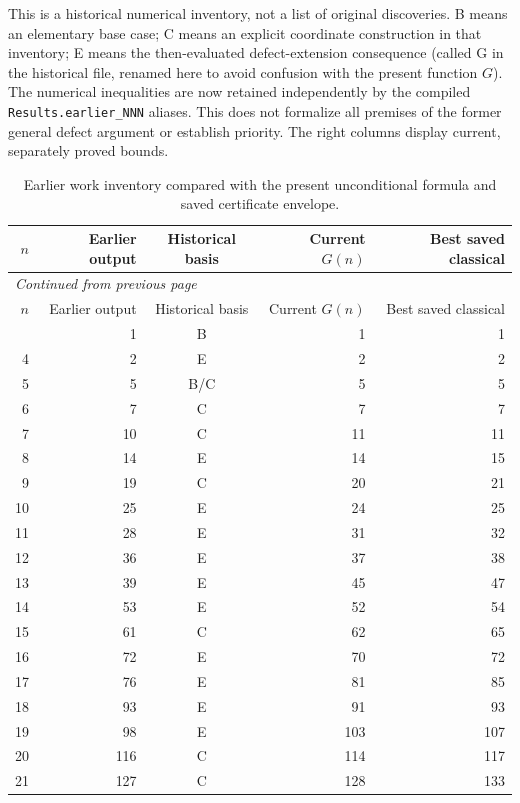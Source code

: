 \noindent This is a historical numerical inventory, not a list of original discoveries. B means an elementary base case; C means an explicit coordinate construction in that inventory; E means the then-evaluated defect-extension consequence (called G in the historical file, renamed here to avoid confusion with the present function $G$). The numerical inequalities are now retained independently by the compiled \texttt{Results.earlier\_NNN} aliases. This does not formalize all premises of the former general defect argument or establish priority. The right columns display current, separately proved bounds.

\begingroup
\small
\setlength{\tabcolsep}{4pt}
\begin{longtable}{rrcrr}
\caption{Earlier work inventory compared with the present unconditional formula and saved certificate envelope.}\label{exp:historical}\\
\toprule
$n$ & Earlier output & Historical basis & Current $G(n)$ & Best saved classical\\
\midrule
\endfirsthead
\multicolumn{5}{l}{\small\itshape Continued from previous page}\\
\toprule
$n$ & Earlier output & Historical basis & Current $G(n)$ & Best saved classical\\
\midrule
\endhead
\midrule
\endfoot
\bottomrule
\endlastfoot
3 & 1 & B & 1 & 1 \\
4 & 2 & E & 2 & 2 \\
5 & 5 & B/C & 5 & 5 \\
6 & 7 & C & 7 & 7 \\
7 & 10 & C & 11 & 11 \\
8 & 14 & E & 14 & 15 \\
9 & 19 & C & 20 & 21 \\
10 & 25 & E & 24 & 25 \\
11 & 28 & E & 31 & 32 \\
12 & 36 & E & 37 & 38 \\
13 & 39 & E & 45 & 47 \\
14 & 53 & E & 52 & 54 \\
15 & 61 & C & 62 & 65 \\
16 & 72 & E & 70 & 72 \\
17 & 76 & E & 81 & 85 \\
18 & 93 & E & 91 & 93 \\
19 & 98 & E & 103 & 107 \\
20 & 116 & C & 114 & 117 \\
21 & 127 & C & 128 & 133 \\

\end{longtable}
